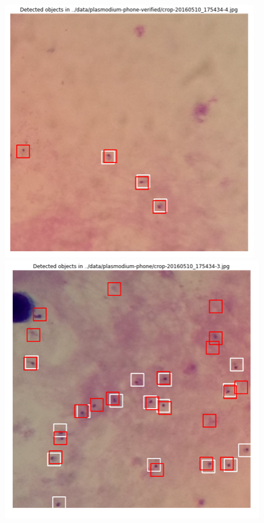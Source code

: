 \documentclass{beamer}
\begin{document}
\begin{frame}
	\begin{block}{\color{red}{Predictions}}
				\begin{figure}[H]
			\begin{minipage}{\textwidth}
				\centering
				\includegraphics[width=.4\textwidth]{prediction2.png}
				\includegraphics[width=.4\textwidth]{prediction.png}
				\label{fig:preds}
			\end{minipage}\\[1em]
		\end{figure}
	\end{block}
\end{frame}
\end{document}
